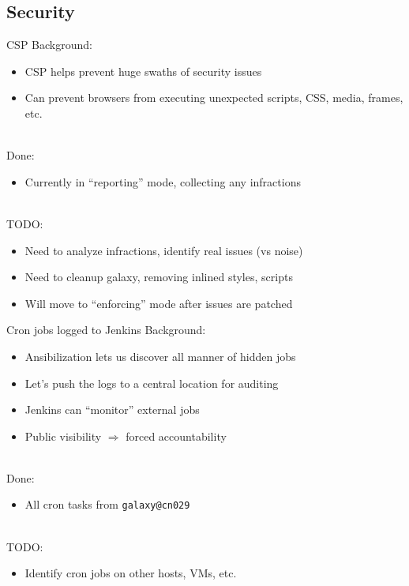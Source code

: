 \documentclass[12pt]{ufrslides}
\begin{document}
\subsection{Security}

	\begin{frame}{CSP}
		Background:
		\begin{itemize}
			\item CSP helps prevent huge swaths of security issues
			\item Can prevent browsers from executing unexpected scripts, CSS, media, frames, etc.
		\end{itemize}
		\ \\[0.5cm]
		Done:
		\begin{itemize}
			\item Currently in ``reporting'' mode, collecting any infractions
		\end{itemize}
		\ \\[0.5cm]
		TODO:
		\begin{itemize}
			\item Need to analyze infractions, identify real issues (vs noise)
			\item Need to cleanup galaxy, removing inlined styles, scripts
			\item Will move to ``enforcing'' mode after issues are patched
		\end{itemize}
	\end{frame}

	\begin{frame}{Cron jobs logged to Jenkins}
		Background:
		\begin{itemize}
			\item Ansibilization lets us discover all manner of hidden jobs
			\item Let's push the logs to a central location for auditing
			\item Jenkins can ``monitor'' external jobs
			\item Public visibility $\Rightarrow$ forced accountability
		\end{itemize}
		\ \\[0.5cm]
		Done:
		\begin{itemize}
			\item All cron tasks from \texttt{galaxy@cn029}
		\end{itemize}
		\ \\[0.5cm]
		TODO:
		\begin{itemize}
			\item Identify cron jobs on other hosts, VMs, etc.
		\end{itemize}
	\end{frame}
\end{document}

